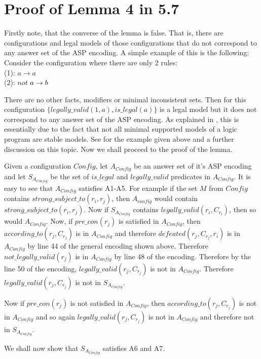 \section{Proof of Lemma 4 in 5.7}\label{sec:proofs}

Firstly note, that the converse of the lemma is false. That is, there are configurations and legal models of those configurations that do not correspond to any answer set of the ASP encoding. A simple example of this is the following: Consider the configuration where there are only 2 rules:\\ (1): $a\rightarrow a$\\
(2): $not$ $a\rightarrow b\\$

There are no other facts, modifiers or minimal inconsistent sets. Then for
this configuration $\{legally\_valid(1,a),
is\_legal(a)\}$ is a legal model but it does not correspond to any answer set
of the ASP encoding. As explained in \cite{KRR_notes}, this is essentially due
to the fact that not all minimal supported models of a logic program are
stable models. See \cite{KRR_notes} for the example given above and a further
discussion on this topic.  Now we shall proceed to the proof of the lemma.

Given a configuration $Config$, let $A_{Config}$ be an answer set of it's ASP
encoding and let $S_{A_{Config}}$ be the set of $is\_legal$ and
$legally\_valid$ predicates in $A_{Config}$. It is easy to see that
$A_{Config}$ satisfies A1-A5. For example if the set $M$ from $Config$
contains $strong\_subject\_to(r_{i}, r_{j})$, then $A_{config}$ would contain
$strong\_subject\_to(r_{i}, r_{j})$. Now if $S_{A_{Config}}$ contains
$legally\_valid(r_{i}, C_{r_{i}})$, then so would $A_{Config}$. Now, if
$pre\_con(r_{j})$ is satisfied in $A_{Config}$, then
$according\_to(r_{j},C_{r_{j}})$ is in $A_{Config}$ and therefore
$defeated(r_{j}, C_{r_{j}}, r_{i})$ is in $A_{Config}$ by line 44 of the
general encoding shown above. Therefore $not\_legally\_valid(r_{j})$ is in
$A_{Config}$ by line 48 of the encoding. Therefore by the line 50 of the
encoding, $legally\_valid(r_{j},C_{r_{j}})$ is not in $A_{Config}$. Therefore
$legally\_valid(r_{j},C_{r_{j}})$ is not in $S_{A_{Config}}$.

Now if $pre\_con(r_{j})$ is not satisfied in $A_{Config}$, then
$according\_to(r_{j},C_{r_{j}})$ is not in $A_{Config}$ and so again
$legally\_valid(r_{j},C_{r_{j}})$ is not in $A_{Config}$ and therefore not in
$S_{A_{Config}}$.

We shall now show that $S_{A_{Config}}$ satisfies A6 and A7.

